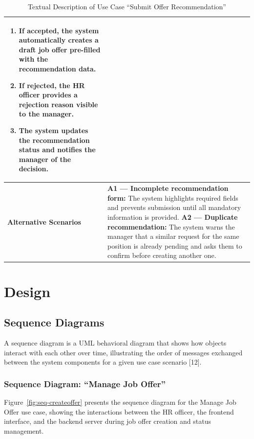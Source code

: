 \begin{table}[H]
\begin{tabularx}{\textwidth}{|>{\bfseries\arraybackslash}p{4cm}|X|}
\begin{enumerate}[leftmargin=*, label=\arabic*., topsep=0pt, itemsep=0pt]
    \item If accepted, the system automatically creates a draft job offer pre-filled with the recommendation data.
    \item If rejected, the HR officer provides a rejection reason visible to the manager.
    \item The system updates the recommendation status and notifies the manager of the decision.
\end{enumerate} \\
\hline
Alternative Scenarios &
\textbf{A1 --- Incomplete recommendation form:} The system highlights required fields and prevents submission until all mandatory information is provided. \newline
\textbf{A2 --- Duplicate recommendation:} The system warns the manager that a similar request for the same position is already pending and asks them to confirm before creating another one. \\
\hline
\end{tabularx}
\caption{Textual Description of Use Case ``Submit Offer Recommendation''}
\label{tab:uc-recommendation}
\end{table}
\normalsize
\setlength{\tabcolsep}{6pt}
\renewcommand{\arraystretch}{1}

\section{Design}

\subsection{Sequence Diagrams}

A sequence diagram is a UML behavioral diagram that shows how objects interact with each other over time, illustrating the order of messages exchanged between the system components for a given use case scenario [12].

\subsubsection{Sequence Diagram: ``Manage Job Offer''}

Figure~\ref{fig:seq-createoffer} presents the sequence diagram for the Manage Job Offer use case, showing the interactions between the HR officer, the frontend interface, and the backend server during job offer creation and status management.

